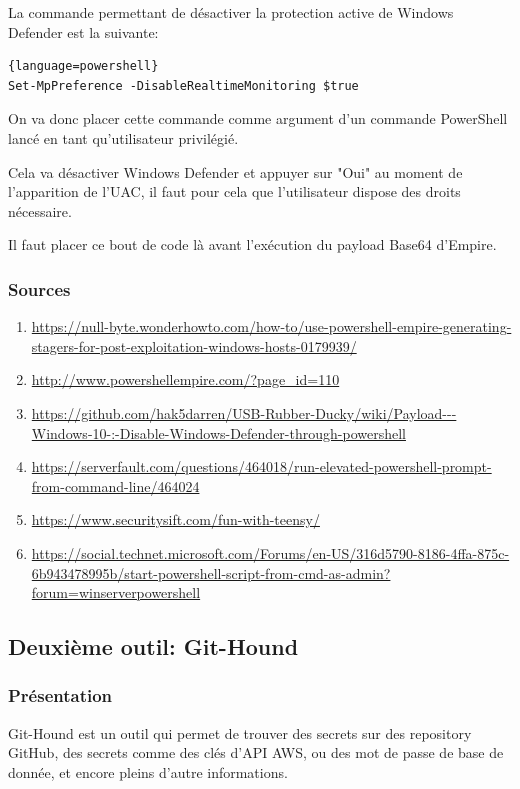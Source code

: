 La commande permettant de désactiver la protection active de Windows Defender est la suivante: 

\begin{lstlisting}{language=powershell}
Set-MpPreference -DisableRealtimeMonitoring $true
\end{lstlisting}

On va donc placer cette commande comme argument d'un commande PowerShell lancé en tant qu'utilisateur privilégié.

Cela va désactiver Windows Defender et appuyer sur "Oui" au moment de l'apparition de l'UAC, il faut pour cela que l'utilisateur dispose des droits nécessaire.

Il faut placer ce bout de code là avant l'exécution du payload Base64 d'Empire.

\subsubsection{Sources}
\begin{enumerate}
    \item \url{https://null-byte.wonderhowto.com/how-to/use-powershell-empire-generating-stagers-for-post-exploitation-windows-hosts-0179939/}
    \item \url{http://www.powershellempire.com/?page_id=110}
    \item \url{https://github.com/hak5darren/USB-Rubber-Ducky/wiki/Payload---Windows-10-:-Disable-Windows-Defender-through-powershell}
    \item \url{https://serverfault.com/questions/464018/run-elevated-powershell-prompt-from-command-line/464024}
    \item \url{https://www.securitysift.com/fun-with-teensy/}
    \item \url{https://social.technet.microsoft.com/Forums/en-US/316d5790-8186-4ffa-875c-6b943478995b/start-powershell-script-from-cmd-as-admin?forum=winserverpowershell}
\end{enumerate}

\subsection{Deuxième outil: Git-Hound}

\subsubsection{Présentation}

Git-Hound est un outil qui permet de trouver des secrets sur des repository GitHub, des secrets comme des clés d'API AWS, 
ou des mot de passe de base de donnée, et encore pleins d'autre informations. 

